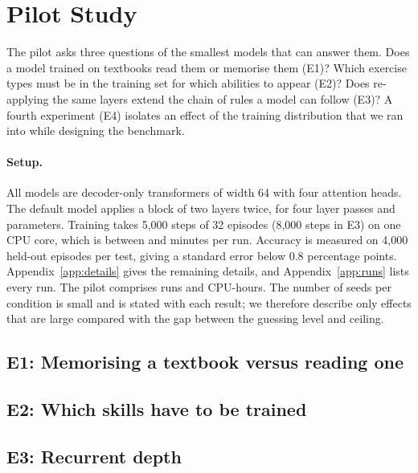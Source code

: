 \section{Pilot Study}
\label{sec:pilot}

The pilot asks three questions of the smallest models that can answer them.
Does a model trained on textbooks read them or memorise them (E1)?
Which exercise types must be in the training set for which abilities to appear (E2)?
Does re-applying the same layers extend the chain of rules a model can follow (E3)?
A fourth experiment (E4) isolates an effect of the training distribution that we ran into while designing the benchmark.


\paragraph{Setup.}
All models are decoder-only transformers of width 64 with four attention heads.
The default model applies a block of two layers twice, for four layer passes and \NparamsMain{} parameters.
Training takes 5{,}000 steps of 32 episodes (8{,}000 steps in E3) on one CPU core, which is between \MinRunMinutes{} and \MaxRunMinutes{} minutes per run.
Accuracy is measured on 4{,}000 held-out episodes per test, giving a standard error below 0.8 percentage points.
Appendix~\ref{app:details} gives the remaining details, and Appendix~\ref{app:runs} lists every run.
The pilot comprises \TotalRuns{} runs and \TotalCpuHours{} CPU-hours.
The number of seeds per condition is small and is stated with each result; we therefore describe only effects that are large compared with the gap between the guessing level and ceiling.

\subsection{E1: Memorising a textbook versus reading one}



\subsection{E2: Which skills have to be trained}



\subsection{E3: Recurrent depth}

